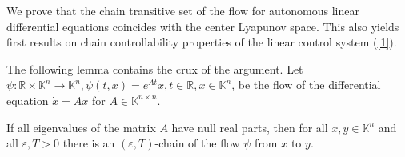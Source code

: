 \documentclass{siamltex}%
\begin{document}
We prove that the chain transitive set of the flow for autonomous linear
differential equations coincides with the center Lyapunov space. This also
yields first results on chain controllability properties of the linear control
system (\ref{1}).

The following lemma contains the crux of the argument. Let $\psi
:\mathbb{R}\times\mathbb{K}^{n}\rightarrow\mathbb{K}^{n},\psi(t,x)=e^{At}%
x,t\in\mathbb{R},x\in\mathbb{K}^{n}$, be the flow of the differential equation
$\dot{x}=Ax$ for $A\in\mathbb{K}^{n\times n}$.

\begin{lemma}
\label{Lemma2_Eduardo}If all eigenvalues of the matrix $A$ have null real
parts, then for all $x,y\in\mathbb{K}^{n}$ and all $\varepsilon,T>0$ there is
an $(\varepsilon,T)$-chain of the flow $\psi$ from $x$ to $y$.
\end{lemma}
\end{document}
